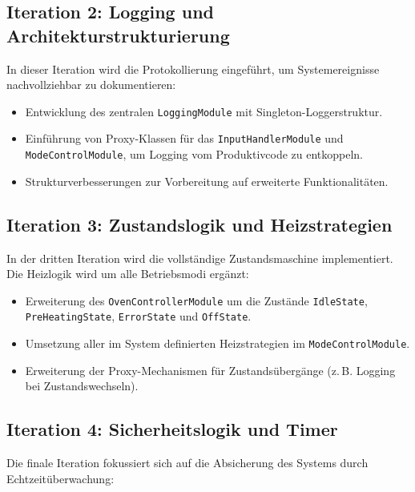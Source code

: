 \documentclass[a4paper,12pt]{article}
\begin{document}
\subsection*{Iteration 2: Logging und Architekturstrukturierung}

In dieser Iteration wird die Protokollierung eingeführt, um Systemereignisse nachvollziehbar zu dokumentieren:

\begin{itemize}
    \item Entwicklung des zentralen \texttt{LoggingModule} mit Singleton-Loggerstruktur.
    \item Einführung von Proxy-Klassen für das \texttt{InputHandlerModule} und \texttt{ModeControlModule}, um Logging vom Produktivcode zu entkoppeln.
    \item Strukturverbesserungen zur Vorbereitung auf erweiterte Funktionalitäten.
\end{itemize}

\subsection*{Iteration 3: Zustandslogik und Heizstrategien}

In der dritten Iteration wird die vollständige Zustandsmaschine implementiert. Die Heizlogik wird um alle Betriebsmodi ergänzt:

\begin{itemize}
    \item Erweiterung des \texttt{OvenControllerModule} um die Zustände \texttt{IdleState}, \texttt{PreHeatingState}, \texttt{ErrorState} und \texttt{OffState}.
    \item Umsetzung aller im System definierten Heizstrategien im \texttt{ModeControlModule}.
    \item Erweiterung der Proxy-Mechanismen für Zustandsübergänge (z.\,B. Logging bei Zustandswechseln).
\end{itemize}

\subsection*{Iteration 4: Sicherheitslogik und Timer}

Die finale Iteration fokussiert sich auf die Absicherung des Systems durch Echtzeitüberwachung:
\end{document}
